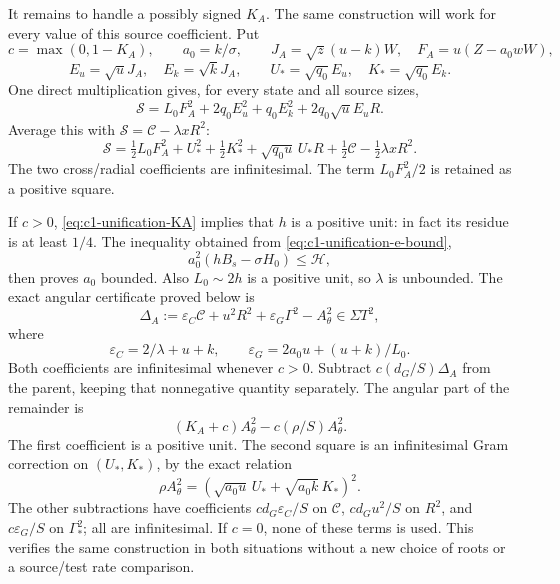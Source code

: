 \documentclass[10pt,a4paper]{article}
\begin{document}
It remains to handle a possibly signed $K_A$. The same construction
will work for every value of this source coefficient. Put
\[
 c=\max(0,1-K_A),\qquad a_0=k/\sigma,\qquad
 J_A=\sqrt z(u-k)W,\quad F_A=u(Z-a_0wW),
\]
\[
 E_u=\sqrt uJ_A,\quad E_k=\sqrt kJ_A,\qquad
 U_* =\sqrt{q_0}E_u,\quad K_* =\sqrt{q_0}E_k.
\]
One direct multiplication gives, for every state and all source sizes,
\begin{equation}\label{eq:c1-unification-US}
 \mathscr S=L_0F_A^2+2q_0E_u^2+q_0E_k^2
                                  +2q_0\sqrt uE_uR.
\end{equation}
Average this with $\mathscr S=\mathscr C-\lambda xR^2$:
\[
 \mathscr S=\tfrac12L_0F_A^2+U_*^2+\tfrac12K_*^2
 +\sqrt{q_0u}\,U_*R+\tfrac12\mathscr C-\tfrac12\lambda xR^2.
\]
The two cross/radial coefficients are infinitesimal. The term
$L_0F_A^2/2$ is retained as a positive square.

If $c>0$, \eqref{eq:c1-unification-KA} implies that $h$ is a positive
unit: in fact its residue is at least $1/4$. The inequality obtained
from \eqref{eq:c1-unification-e-bound},
\[
 a_0^2(hB_s-\sigma H_0)\le\mathcal H,
\]
then proves $a_0$ bounded. Also $L_0\sim2h$ is a positive unit,
so $\lambda$ is unbounded. The exact angular certificate proved
below is
\begin{equation}\label{eq:c1-unification-angular-budget}
 \Delta_A:=\varepsilon_C\mathscr C+u^2R^2
                         +\varepsilon_G\Gamma^2-A_\theta^2\in\Sigma T^2,
\end{equation}
where
\[
 \varepsilon_C=2/\lambda+u+k,\qquad
 \varepsilon_G=2a_0u+(u+k)/L_0.
\]
Both coefficients are infinitesimal whenever $c>0$. Subtract
$c(d_G/S)\Delta_A$ from the parent, keeping that nonnegative
quantity separately. The angular part of the remainder is
\[
 (K_A+c)A_\theta^2-c(\rho/S)A_\theta^2.
\]
The first coefficient is a positive unit. The second square is an
infinitesimal Gram correction on $(U_*,K_*)$, by the exact relation
\begin{equation}\label{eq:c1-unification-weighted-angular}
 \rho A_\theta^2=
       (\sqrt{a_0u}\,U_*+\sqrt{a_0k}\,K_*)^2.
\end{equation}
The other subtractions have coefficients
$c d_G\varepsilon_C/S$ on $\mathscr C$,
$c d_Gu^2/S$ on $R^2$, and $c\varepsilon_G/S$ on $\Gamma_*^2$;
all are infinitesimal. If $c=0$, none of these terms is used.
This verifies the same construction in both situations without a
new choice of roots or a source/test rate comparison.
\end{document}
